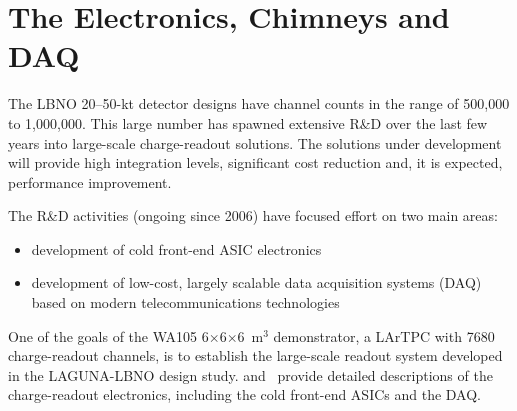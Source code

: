 \section{The Electronics, Chimneys and DAQ}
\label{sec:detectors-fd-alt-elec}

The LBNO 20--50-kt detector designs have channel
counts in the range of 500,000 to 1,000,000. This large number has spawned extensive
 R\&D over the last few years into large-scale charge-readout solutions.  The 
 solutions under development will provide 
high integration levels, significant cost reduction and, it is expected, 
performance improvement.


The R\&D activities (ongoing since 2006) have focused effort on two main areas: %
\begin {itemize} 
\item{development of cold front-end ASIC electronics}
\item{development of low-cost, largely scalable data 
acquisition systems (DAQ) based on modern telecommunications technologies}
\end{itemize}

One of the goals
of the WA105 6$\times$6$\times$6~m$^3$ demonstrator, a LArTPC with \num{7680}
charge-readout channels, is to establish  the large-scale readout
system developed in the LAGUNA-LBNO design study. \anxdualtdr and~\cite{WA105_SREP}
provide detailed
descriptions of the charge-readout electronics, including the cold front-end ASICs and the DAQ.

